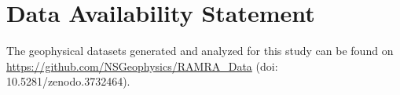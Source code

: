 \documentclass[utf8]{frontiersSCNS}
\newcommand{\alon}{\begin{color}{red}}
\newcommand{\aloff}{\end{color}}
\begin{document}



\section*{Data Availability Statement}
The geophysical datasets generated and analyzed for this study can be found on \url{https://github.com/NSGeophysics/RAMRA_Data} (doi: 10.5281/zenodo.3732464).




\end{document}
